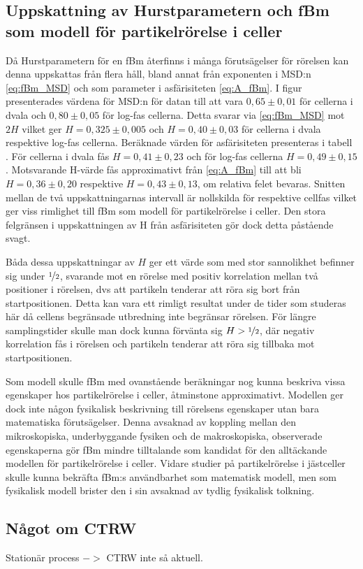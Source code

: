 \subsection{Uppskattning av Hurstparametern och fBm som modell för partikelrörelse i celler}

Då Hurstparametern för en fBm återfinns i många förutsägelser för rörelsen kan denna uppskattas från flera håll, bland annat från exponenten i MSD:n \eqref{eq:fBm_MSD} och som parameter i asfärisiteten \eqref{eq:A_fBm}. 
I figur  presenterades värdena för MSD:n för datan till att vara $0,65\pm0,01$ för cellerna i dvala och $0,80\pm0,05$ för log-fas cellerna. Detta svarar via \eqref{eq:fBm_MSD} mot $2H$ vilket ger $H=0,325\pm0,005$ och $H=0,40\pm0,03$ för cellerna i dvala respektive log-fas cellerna.
Beräknade värden för asfärisiteten presenteras i tabell . För cellerna i dvala fås $H=0,41\pm 0,23$ och för log-fas cellerna $H=0,49\pm 0,15$. Motsvarande H-värde fås approximativt från \eqref{eq:A_fBm} till att bli $H=0,36\pm0,20$ respektive $H=0,43\pm0,13$, om relativa felet bevaras. Snitten mellan de två uppskattningarnas intervall är nollskilda för respektive cellfas vilket ger viss rimlighet till fBm som modell för partikelrörelse i celler. Den stora felgränsen i uppskattningen av H från asfärisiteten gör dock detta påstående svagt.

Båda dessa uppskattningar av $H$ ger ett värde som med stor sannolikhet befinner sig under $\nicefrac{1}{2}$, svarande mot en rörelse med positiv korrelation mellan två positioner i rörelsen, dvs att partikeln tenderar att röra sig bort från startpositionen. Detta kan vara ett rimligt resultat under de tider som studeras här då cellens begränsade utbredning inte begränsar rörelsen. För längre samplingstider skulle man dock kunna förvänta sig $H>\nicefrac{1}{2}$, där negativ korrelation fås i rörelsen och partikeln tenderar att röra sig tillbaka mot startpositionen. 

Som modell skulle fBm med ovanstående beräkningar nog kunna beskriva vissa egenskaper hos partikelrörelse i celler, åtminstone approximativt. Modellen ger dock inte någon fysikalisk beskrivning till rörelsens egenskaper utan bara matematiska förutsägelser. Denna avsaknad av koppling mellan den mikroskopiska, underbyggande fysiken och de makroskopiska, observerade egenskaperna gör fBm mindre tilltalande som kandidat för den alltäckande modellen för partikelrörelse i celler. Vidare studier på partikelrörelse i jästceller skulle kunna bekräfta fBm:s användbarhet som matematisk modell, men som fysikalisk modell brister den i sin avsaknad av tydlig fysikalisk tolkning.

\subsection{Något om CTRW}
Stationär process $->$ CTRW inte så aktuell.


